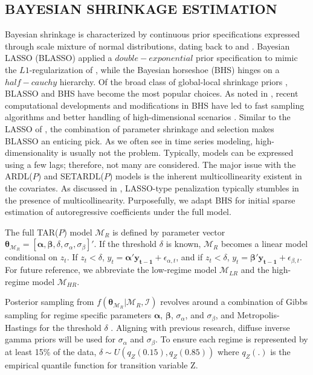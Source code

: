 \subsection{BAYESIAN SHRINKAGE ESTIMATION}
Bayesian shrinkage is characterized by continuous prior specifications expressed through scale mixture of normal distributions, dating back to\cite{Andrews1974} and \cite{West1987}.  Bayesian LASSO (BLASSO) \citep{Yuan2005,Park2008,Hans2009,Hans2010,Rajaratnam2015} applied a $double-exponential$ prior specification to mimic the $L1$-regularization of \cite{Tibshirani1994}, while the Bayesian horseshoe (BHS)  \cite{Carvalho2009,Carvalho2010} hinges on a $half-cauchy$ hierarchy.  Of the broad class of global-local shrinkage priors \citep{Polson2010}, BLASSO and BHS have become the most popular choices. As noted in \cite{Bhadra2017}, recent computational developments and modifications in BHS have led to fast sampling algorithms and better handling of high-dimensional scenarios \citep{Bhadra2016,Makalic2016b}.  Similar to the LASSO of \cite{Tibshirani1994}, the combination of parameter shrinkage and selection makes BLASSO an enticing pick. As we often see in time series modeling, high-dimensionality is usually not the problem. Typically, models can be expressed using a few lags; therefore, not many are considered. The major issue with the ARDL($P$) and SETARDL($P$) models is the inherent multicollinearity existent in the covariates. As discussed in \cite{Friedman2001,Zou2005,Mallick2013}, LASSO-type penalization typically stumbles in the presence of multicollinearity. Purposefully, we adapt BHS for initial sparse estimation of autoregressive coefficients under the full model.

The full TAR($P$) model $\mathcal{M}_R$ is defined by parameter vector $\bm{\theta}_{\mathcal{M}_R}=[\bm{\alpha},\bm{\beta},\delta,\sigma_\alpha,\sigma_\beta]'$. If the threshold $\delta$ is known, $\mathcal{M}_R$ becomes a linear model conditional on $z_t$. If $z_t<\delta$, $y_t=\bm{\alpha}'\bm{y_{t-1}}+\epsilon_{\alpha,t}$, and if $z_t<\delta$, $y_t=\bm{\beta}'\bm{y_{t-1}}+\epsilon_{\beta,t}$. For future reference, we abbreviate the low-regime model $\mathcal{M}_{LR}$ and the high-regime model $\mathcal{M}_{HR}$.

Posterior sampling from $f(\bm{\theta}_{\mathcal{M}_R}|\mathcal{M}_R,\mathcal{I})$ revolves around a combination of Gibbs sampling \citep{Gelfand1990} for regime specific parameters $\bm{\alpha}$, $\bm{\beta}$, $\sigma_\alpha$, and $\sigma_\beta$, and Metropolis-Hastings \citep{Metropolis1953,Hastings1970} for the threshold $\delta$  \citep{Geweke1993,Chen1998,Koop1999,Campbell2004}. Aligning with previous research, diffuse inverse gamma priors will be used for $\sigma_\alpha$ and $\sigma_\beta$. To ensure each regime is represented by at least 15\% of the data, $\delta\sim U(q_{Z}(0.15),q_Z(0.85))$ where $q_Z(.)$ is the empirical quantile function for transition variable Z.

